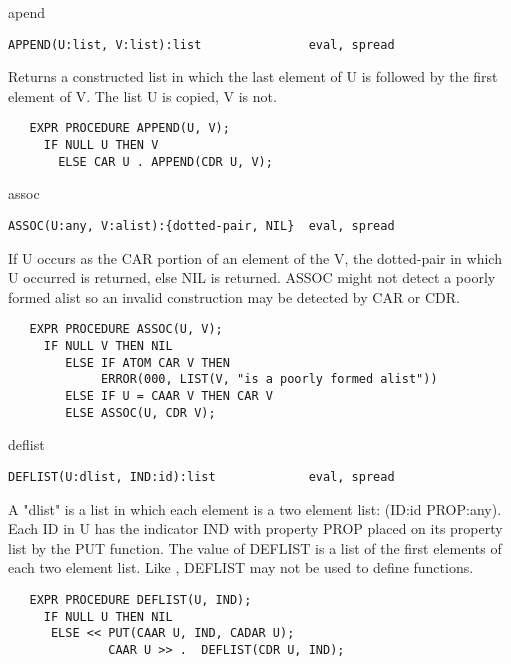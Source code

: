 \begin{Function}{apend}
\begin{verbatim}
APPEND(U:list, V:list):list               eval, spread
\end{verbatim}
   Returns  a constructed list in which  the last element of U is
   followed  by the first element  of V. The list  U is copied, V
   is not.
\begin{verbatim}
   EXPR PROCEDURE APPEND(U, V);
     IF NULL U THEN V
       ELSE CAR U . APPEND(CDR U, V);
\end{verbatim}
\end{Function}
\begin{Function}{assoc}
\begin{verbatim}
ASSOC(U:any, V:alist):{dotted-pair, NIL}  eval, spread
\end{verbatim}
   If  U occurs as the CAR portion of  an element of the  V,
   the  dotted-pair in which U occurred  is returned, else NIL is
   returned.   ASSOC might not detect a poorly formed alist so an
   invalid construction may be detected by CAR or CDR.
\begin{verbatim}
   EXPR PROCEDURE ASSOC(U, V);
     IF NULL V THEN NIL
        ELSE IF ATOM CAR V THEN
             ERROR(000, LIST(V, "is a poorly formed alist"))
        ELSE IF U = CAAR V THEN CAR V
        ELSE ASSOC(U, CDR V);
\end{verbatim}
\end{Function}
\begin{Function}{deflist}
\begin{verbatim}
DEFLIST(U:dlist, IND:id):list             eval, spread
\end{verbatim}
   A  "dlist" is a  list in which  each element is  a two element
   list:   (ID:id  PROP:any).   Each  ID in  U has  the indicator
   IND  with property  PROP placed  on its  property list  by the
   PUT  function.   The value of  DEFLIST is a list  of the first
   elements  of each two element list.  Like , DEFLIST may not
   be used to define functions.
\begin{verbatim}
   EXPR PROCEDURE DEFLIST(U, IND);
     IF NULL U THEN NIL
      ELSE << PUT(CAAR U, IND, CADAR U);
              CAAR U >> .  DEFLIST(CDR U, IND);
\end{verbatim}
\end{Function}
